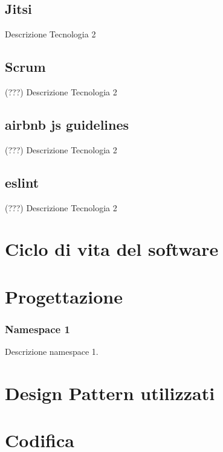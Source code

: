 \subsection*{Jitsi}
Descrizione Tecnologia 2

\subsection*{Scrum} (???)
Descrizione Tecnologia 2

\subsection*{airbnb js guidelines} (???)
Descrizione Tecnologia 2

\subsection*{eslint} (???)
Descrizione Tecnologia 2

\section{Ciclo di vita del software}
\label{sec:ciclo-vita-software}

\section{Progettazione}
\label{sec:progettazione}

\subsubsection{Namespace 1} %
Descrizione namespace 1.

\begin{namespacedesc}
\end{namespacedesc}


\section{Design Pattern utilizzati}

\section{Codifica}
